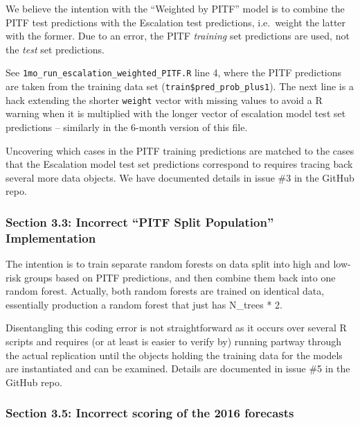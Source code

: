 \documentclass[
]{article}
\begin{document}
We believe the intention with the ``Weighted by PITF'' model is to combine the PITF test predictions with the Escalation test predictions, i.e.~weight the latter with the former. Due to an error, the PITF \emph{training} set predictions are used, not the \emph{test} set predictions.

See \texttt{1mo\_run\_escalation\_weighted\_PITF.R} line 4, where the PITF predictions are taken from the training data set (\texttt{train\$pred\_prob\_plus1}). The next line is a hack extending the shorter \texttt{weight} vector with missing values to avoid a R warning when it is multiplied with the longer vector of escalation model test set predictions -- similarly in the 6-month version of this file.

Uncovering which cases in the PITF training predictions are matched to the cases that the Escalation model test set predictions correspond to requires tracing back several more data objects. We have documented details in issue \#3 in the GitHub repo.

\hypertarget{section-3.3-incorrect-pitf-split-population-implementation}{%
\subsubsection{Section 3.3: Incorrect ``PITF Split Population'' Implementation}\label{section-3.3-incorrect-pitf-split-population-implementation}}

The intention is to train separate random forests on data split into high and low-risk groups based on PITF predictions, and then combine them back into one random forest. Actually, both random forests are trained on identical data, essentially production a random forest that just has N\_trees * 2.

Disentangling this coding error is not straightforward as it occurs over several R scripts and requires (or at least is easier to verify by) running partway through the actual replication until the objects holding the training data for the models are instantiated and can be examined. Details are documented in issue \#5 in the GitHub repo.

\hypertarget{section-3.5-incorrect-scoring-of-the-2016-forecasts}{%
\subsubsection{Section 3.5: Incorrect scoring of the 2016 forecasts}\label{section-3.5-incorrect-scoring-of-the-2016-forecasts}}
\end{document}
